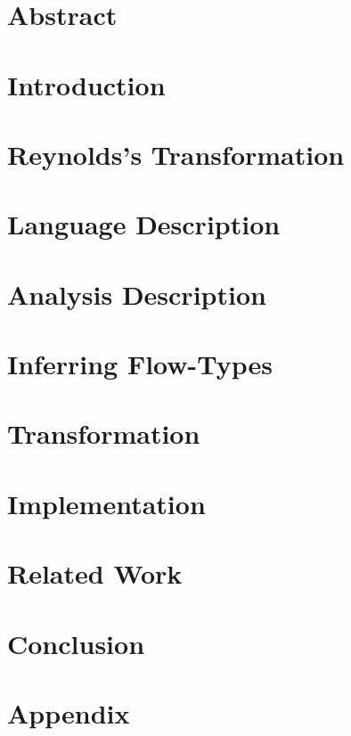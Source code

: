 \documentclass[fleqn, 12pt, a4paper]{article}
\begin{document}
\section{Abstract}
\section{Introduction}

\newpage
\section{Reynolds's Transformation}

\newpage
\section{Language Description}

\section{Analysis Description}

\section{Inferring Flow-Types}

\newpage
\section{Transformation}
\section{Implementation}
\section{Related Work}
\section{Conclusion}
\section{Appendix}



\end{document}
